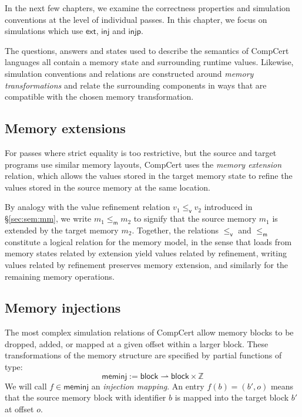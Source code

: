 \documentclass[draft,11pt]{report}
\theoremstyle{definition}
\newcommand{\kw}[1]{\ensuremath{ \mathsf{#1} }}
\newcommand{\vref}{\le_\kw{v}}   %
\newcommand{\mext}{\le_\kw{m}}   %
\begin{document}
In the next few chapters,
we examine the correctness properties
and simulation conventions
at the level of individual passes.
In this chapter,
we focus on simulations which use
$\kw{ext}$, $\kw{inj}$ and $\kw{injp}$.

The questions, answers and states
used to describe the semantics of CompCert languages all contain
a memory state and surrounding runtime values.
Likewise, simulation conventions and relations
are constructed around \emph{memory transformations}
and relate the surrounding components in ways that %
are compatible with the chosen memory transformation.

\subsection{Memory extensions} \label{sec:memext} %

For passes where strict equality is too restrictive,
but the source and target programs
use similar memory layouts,
CompCert uses the \emph{memory extension} relation,
which allows the values
stored in the target memory state to refine
the values stored in the source memory at the same location.

By analogy with
the value refinement relation $v_1 \vref v_2$
introduced in \S\ref{sec:sem:mm},
we write $m_1 \mext m_2$ to signify that
the source memory $m_1$ is extended by
the target memory $m_2$.
Together,
the relations $\vref$ and $\mext$
constitute a logical relation for the memory model,
in the sense that
loads from memory states related by extension
yield values related by refinement,
writing values related by refinement
preserves memory extension,
and similarly for the remaining memory operations.


\subsection{Memory injections} \label{sec:meminj} %

The most complex simulation relations of CompCert
allow memory blocks to be dropped, added, or
mapped at a given offset within a larger block.
These transformations of the memory structure
are specified by partial functions of type:
\[
  \kw{meminj} := \kw{block} \rightharpoonup \kw{block} \times \mathbb{Z}
\]
We will call $f \in \kw{meminj}$
an \emph{injection mapping}.
An entry $f(b) = (b', o)$
means that the source memory block with identifier $b$
is mapped into the target block $b'$
at offset $o$.
\end{document}

